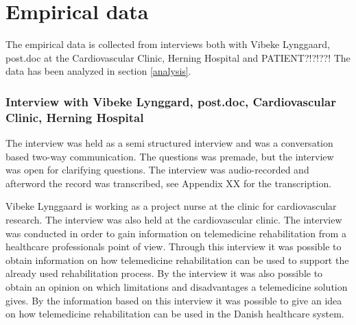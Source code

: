 \chapter{Empirical data}
\label{empirical}


The empirical data is collected from interviews both with Vibeke Lynggaard, post.doc at the Cardiovascular Clinic, Herning Hospital and PATIENT?!?!??! The data has been analyzed in section \ref{analysis}. 


\subsection{Interview with Vibeke Lynggard, post.doc, Cardiovascular Clinic, Herning Hospital}
The interview was held as a semi structured interview and was a conversation based two-way communication. The questions was premade, but the interview was open for clarifying questions. The interview was audio-recorded and afterword the record was transcribed, see Appendix XX for the transcription.    

Vibeke Lynggaard is working as a project nurse at the clinic for cardiovascular research. The interview was also held at the cardiovascular clinic. The interview was conducted in order to gain information on telemedicine rehabilitation from a healthcare professionals point of view. Through this interview it was possible to obtain information on how telemedicine rehabilitation can be used to support the already used rehabilitation process. By the interview it was also possible to obtain an opinion on which limitations and disadvantages a telemedicine solution gives. By the information based on this interview it was possible to give an idea on how telemedicine rehabilitation can be used in the Danish healthcare system. 

